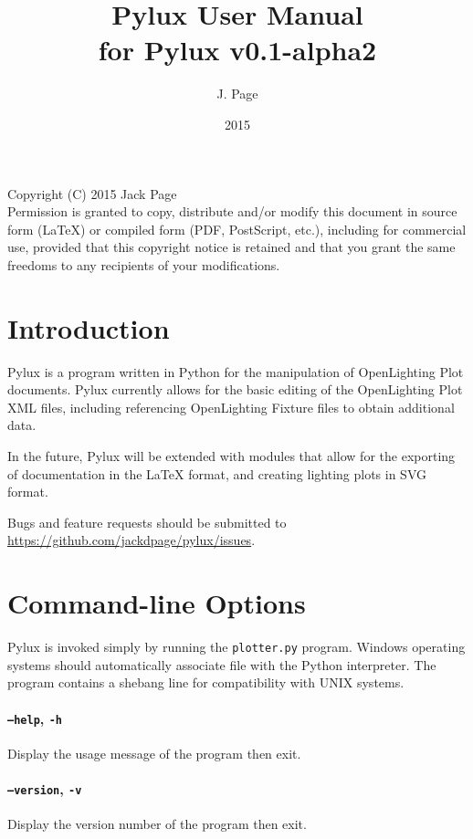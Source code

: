 \documentclass[a4paper]{article}
\begin{document}
\title{Pylux User Manual \\ \large{for Pylux v0.1-alpha2}}
\author{J. Page}
\date{2015}
\maketitle
\vspace{1.0pt}
Copyright (C)  2015 Jack Page \\
Permission is granted to copy, distribute and/or modify this document
in source form (LaTeX) or compiled form (PDF, PostScript, etc.), including 
for commercial use, provided that this copyright notice is retained and that 
you grant the same freedoms to any recipients of your modifications.
\tableofcontents
\newpage
\section{Introduction}
Pylux is a program written in Python for the manipulation of OpenLighting Plot
documents. Pylux currently allows for the basic editing of the OpenLighting
Plot XML files, including referencing OpenLighting Fixture files to obtain
additional data.

In the future, Pylux will be extended with modules that allow for the exporting
of documentation in the \LaTeX{} format, and creating lighting plots in SVG 
format.

Bugs and feature requests should be submitted to 
\url{https://github.com/jackdpage/pylux/issues}.

\section{Command-line Options}
Pylux is invoked simply by running the \texttt{plotter.py} program. Windows 
operating systems should automatically associate file with the Python 
interpreter. The program contains a shebang line for compatibility with UNIX
systems. 

\paragraph{\texttt{--help}, \texttt{-h}}
Display the usage message of the program then exit.

\paragraph{\texttt{--version}, \texttt{-v}}
Display the version number of the program then exit.
\end{document}
